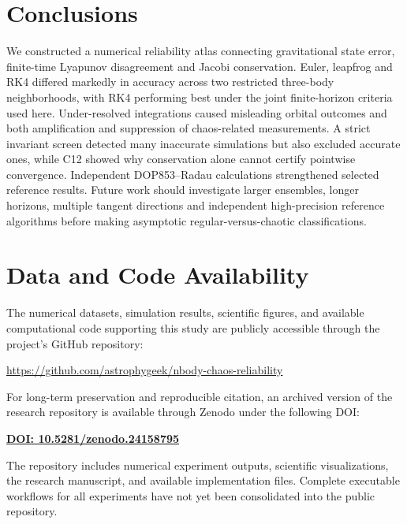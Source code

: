 \documentclass[10pt,letterpaper,twocolumn]{article}
\begin{document}
\section{Conclusions}
We constructed a numerical reliability atlas connecting gravitational state error, finite-time Lyapunov disagreement and Jacobi conservation. Euler, leapfrog and RK4 differed markedly in accuracy across two restricted three-body neighborhoods, with RK4 performing best under the joint finite-horizon criteria used here. Under-resolved integrations caused misleading orbital outcomes and both amplification and suppression of chaos-related measurements. A strict invariant screen detected many inaccurate simulations but also excluded accurate ones, while C12 showed why conservation alone cannot certify pointwise convergence. Independent DOP853--Radau calculations strengthened selected reference results. Future work should investigate larger ensembles, longer horizons, multiple tangent directions and independent high-precision reference algorithms before making asymptotic regular-versus-chaotic classifications.


\section*{Data and Code Availability}

The numerical datasets, simulation results, scientific figures,
and available computational code supporting this study are
publicly accessible through the project's GitHub repository:

\begin{center}
\url{https://github.com/astrophygeek/nbody-chaos-reliability}
\end{center}

For long-term preservation and reproducible citation, an
archived version of the research repository is available
through Zenodo under the following DOI:

\begin{center}
\href{https://doi.org/10.5281/zenodo.24158795}
{\textbf{DOI: 10.5281/zenodo.24158795}}
\end{center}

The repository includes numerical experiment outputs,
scientific visualizations, the research manuscript, and
available implementation files. Complete executable
workflows for all experiments have not yet been consolidated
into the public repository.
\end{document}
